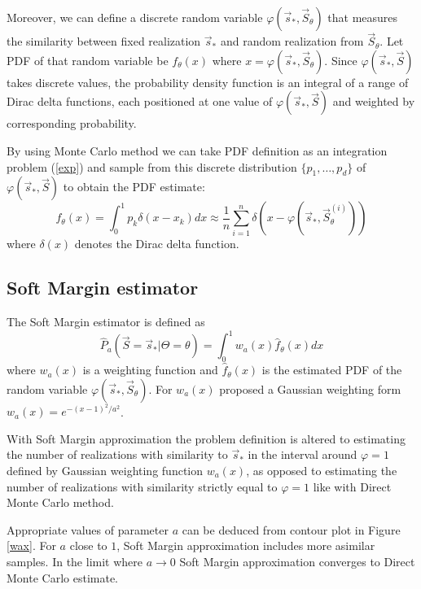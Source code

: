 \documentclass[times, utf8, diplomski]{fer}
\begin{document}
Moreover, we  can define a discrete random variable $\varphi(\vec s_*, \vec S_{\theta})$ that measures the similarity between fixed realization $\vec s_*$ and random realization from $\vec S_{\theta}$. Let PDF of that random variable be $f_\theta(x)$ where $x = \varphi(\vec s_*, \vec S_{\theta})$. Since $\varphi(\vec s_*, \vec S)$ takes  discrete values, the probability density function is an integral of a range of Dirac delta functions, each positioned at one value of $\varphi(\vec s_*, \vec S)$ and weighted by corresponding probability. 

By using Monte Carlo method we can take PDF definition as an integration problem (\ref{exp}) and sample from this discrete distribution $\{p_1, \ldots, p_d\}$ of  $\varphi(\vec s_*, \vec S)$  to obtain the PDF estimate:
\begin{equation}
f_{\theta}(x) = \int_0^1 p_k \delta(x - x_k)dx \approx \frac{1}{n} \sum_{i = 1}^{n} \delta(x - \varphi(\vec s_*, \vec S_{\theta} ^{(i)}))
\label{Fapprox}
\end{equation}
where $\delta(x)$ denotes the Dirac delta function.

\subsection{Soft Margin estimator}

The Soft Margin estimator is defined as 
\begin{equation}
\hat{P}_a(\vec S = \vec s_* | \Theta = \theta) = \int_0^1 w_a(x)\hat{f}_\theta(x)dx
\label{SMF1}
\end{equation}
where $w_a(x)$ is a weighting function and $\hat{f}_\theta(x)$ is the estimated PDF of the random variable $\varphi(\vec s_*, \vec S_\theta)$. For $w_a(x)$ \citet{Nino} proposed a Gaussian weighting form $w_a(x) = e^{-(x -1)^2 / a ^2}$. 

With Soft Margin approximation the problem definition is altered to estimating the number of realizations with similarity to $\vec s_*$ in the interval around $\varphi = 1$  defined by Gaussian weighting function $w_a(x)$, as opposed to estimating the number of realizations with similarity strictly equal to $\varphi = 1$ like with Direct Monte Carlo method. 

Appropriate values of parameter $a$ can be deduced from contour plot in Figure \ref{wax}. For $a$ close to $1$, Soft Margin approximation includes more asimilar samples.
In the limit where $a \rightarrow 0$ Soft Margin approximation converges to Direct Monte Carlo estimate.
\end{document}
